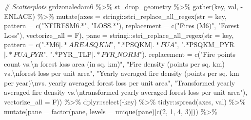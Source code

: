 \documentclass[10pt,landscape,a3paper]{article}
\newenvironment{Shaded}{\begin{snugshade}}{\end{snugshade}}
\newcommand{\AttributeTok}[1]{\textcolor[rgb]{0.77,0.63,0.00}{#1}}
\newcommand{\CommentTok}[1]{\textcolor[rgb]{0.56,0.35,0.01}{\textit{#1}}}
\newcommand{\DecValTok}[1]{\textcolor[rgb]{0.00,0.00,0.81}{#1}}
\newcommand{\FunctionTok}[1]{\textcolor[rgb]{0.00,0.00,0.00}{#1}}
\newcommand{\NormalTok}[1]{#1}
\newcommand{\SpecialCharTok}[1]{\textcolor[rgb]{0.00,0.00,0.00}{#1}}
\newcommand{\StringTok}[1]{\textcolor[rgb]{0.31,0.60,0.02}{#1}}
\begin{document}
\begin{Shaded}
\begin{Highlighting}[]
\CommentTok{\# Scatterplots}
\NormalTok{grdzonaledam6 }\SpecialCharTok{\%\textgreater{}\%}
\NormalTok{    st\_drop\_geometry }\SpecialCharTok{\%\textgreater{}\%}
    \FunctionTok{gather}\NormalTok{(key, val, }\SpecialCharTok{{-}}\NormalTok{ENLACE) }\SpecialCharTok{\%\textgreater{}\%}
    \FunctionTok{mutate}\NormalTok{(}\AttributeTok{axes =}\NormalTok{ stringi}\SpecialCharTok{::}\FunctionTok{stri\_replace\_all\_regex}\NormalTok{(}\AttributeTok{str =}\NormalTok{ key, }\AttributeTok{pattern =} \FunctionTok{c}\NormalTok{(}\StringTok{"NFIRESM6.*"}\NormalTok{,}
        \StringTok{"LOSS.*"}\NormalTok{), }\AttributeTok{replacement =} \FunctionTok{c}\NormalTok{(}\StringTok{"Fires (M6)"}\NormalTok{, }\StringTok{"Forest Loss"}\NormalTok{), }\AttributeTok{vectorize\_all =}\NormalTok{ F),}
        \AttributeTok{pane =}\NormalTok{ stringi}\SpecialCharTok{::}\FunctionTok{stri\_replace\_all\_regex}\NormalTok{(}\AttributeTok{str =}\NormalTok{ key, }\AttributeTok{pattern =} \FunctionTok{c}\NormalTok{(}\StringTok{".*M6$|.*AREASQKM$"}\NormalTok{,}
            \StringTok{".*PSQKM$|.*PUA$"}\NormalTok{, }\StringTok{".*PSQKM\_PYR$|.*PUA\_PYR$"}\NormalTok{, }\StringTok{".*PYR\_TLP$|.*PYR\_NORM$"}\NormalTok{),}
            \AttributeTok{replacement =} \FunctionTok{c}\NormalTok{(}\StringTok{"Fire points count vs.}\SpecialCharTok{\textbackslash{}n}\StringTok{ forest loss area (in sq. km)"}\NormalTok{,}
                \StringTok{"Fire density (points per sq. km) vs.}\SpecialCharTok{\textbackslash{}n}\StringTok{forest loss per unit area"}\NormalTok{,}
                \StringTok{"Yearly averaged fire density (points per sq. km per year)}\SpecialCharTok{\textbackslash{}n}\StringTok{vs. yearly averaged forest loss per unit area"}\NormalTok{,}
                \StringTok{"Transformed yearly averaged fire density vs.}\SpecialCharTok{\textbackslash{}n}\StringTok{transformed yearly averaged forest loss per unit area"}\NormalTok{),}
            \AttributeTok{vectorize\_all =}\NormalTok{ F)) }\SpecialCharTok{\%\textgreater{}\%}
\NormalTok{    dplyr}\SpecialCharTok{::}\FunctionTok{select}\NormalTok{(}\SpecialCharTok{{-}}\NormalTok{key) }\SpecialCharTok{\%\textgreater{}\%}
\NormalTok{    tidyr}\SpecialCharTok{::}\FunctionTok{spread}\NormalTok{(axes, val) }\SpecialCharTok{\%\textgreater{}\%}
    \FunctionTok{mutate}\NormalTok{(}\AttributeTok{pane =} \FunctionTok{factor}\NormalTok{(pane, }\AttributeTok{levels =} \FunctionTok{unique}\NormalTok{(pane)[}\FunctionTok{c}\NormalTok{(}\DecValTok{2}\NormalTok{, }\DecValTok{1}\NormalTok{, }\DecValTok{4}\NormalTok{, }\DecValTok{3}\NormalTok{)])) }\SpecialCharTok{\%\textgreater{}\%}

\end{Highlighting}
\end{Shaded}
\end{document}

